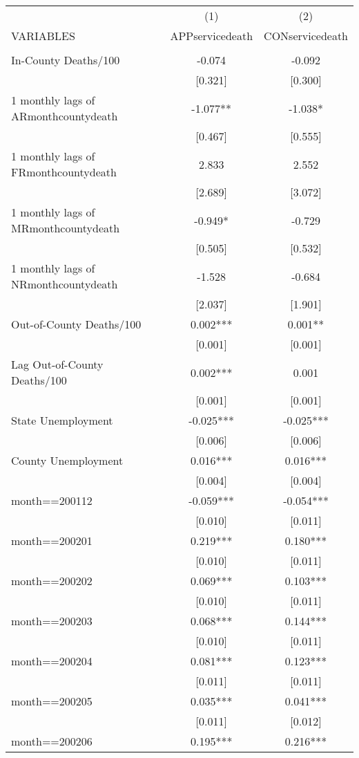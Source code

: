 \documentclass[]{article}
\begin{document}
\begin{tabular}{lcc} \hline
 & (1) & (2) \\
VARIABLES & APPservicedeath & CONservicedeath \\ \hline
 &  &  \\
In-County Deaths/100 & -0.074 & -0.092 \\
 & [0.321] & [0.300] \\
1 monthly lags of ARmonthcountydeath & -1.077** & -1.038* \\
 & [0.467] & [0.555] \\
1 monthly lags of FRmonthcountydeath & 2.833 & 2.552 \\
 & [2.689] & [3.072] \\
1 monthly lags of MRmonthcountydeath & -0.949* & -0.729 \\
 & [0.505] & [0.532] \\
1 monthly lags of NRmonthcountydeath & -1.528 & -0.684 \\
 & [2.037] & [1.901] \\
Out-of-County Deaths/100 & 0.002*** & 0.001** \\
 & [0.001] & [0.001] \\
Lag Out-of-County Deaths/100 & 0.002*** & 0.001 \\
 & [0.001] & [0.001] \\
State Unemployment & -0.025*** & -0.025*** \\
 & [0.006] & [0.006] \\
County Unemployment & 0.016*** & 0.016*** \\
 & [0.004] & [0.004] \\
month==200112 & -0.059*** & -0.054*** \\
 & [0.010] & [0.011] \\
month==200201 & 0.219*** & 0.180*** \\
 & [0.010] & [0.011] \\
month==200202 & 0.069*** & 0.103*** \\
 & [0.010] & [0.011] \\
month==200203 & 0.068*** & 0.144*** \\
 & [0.010] & [0.011] \\
month==200204 & 0.081*** & 0.123*** \\
 & [0.011] & [0.011] \\
month==200205 & 0.035*** & 0.041*** \\
 & [0.011] & [0.012] \\
month==200206 & 0.195*** & 0.216*** \\

\end{tabular}
\end{document}
